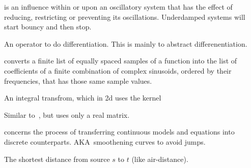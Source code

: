\begin{definition}[Damping]
    is an influence within or upon an oscillatory system that has the effect of
    reducing, restricting or preventing its oscillations. 
    Underdamped systems will start bouncy and then stop.

\end{definition}

\begin{definition}
    An operator to do differentiation. This is mainly to abstract
    differenentiation.

\end{definition}

\begin{definition}\label{dft}
    converts a finite list of equally spaced samples of a function into the
    list of coefficients of a finite combination of complex sinusoids, ordered
    by their frequencies, that has those same sample values.

\end{definition}

\begin{definition}
    An integral transfrom, which in 2d uses the kernel
\end{definition}

\begin{definition}
    Similar to~, but uses only a real matrix.

\end{definition}

\begin{definition}[Discretization]
    concerns the process of transferring
    continuous models and equations into discrete counterparts. 
    AKA\ smoothening curves to avoid jumps.

\end{definition}

\begin{definition}[Displacement]
    The shortest distance from source $s$ to $t$ (like air-distance).

\end{definition}

